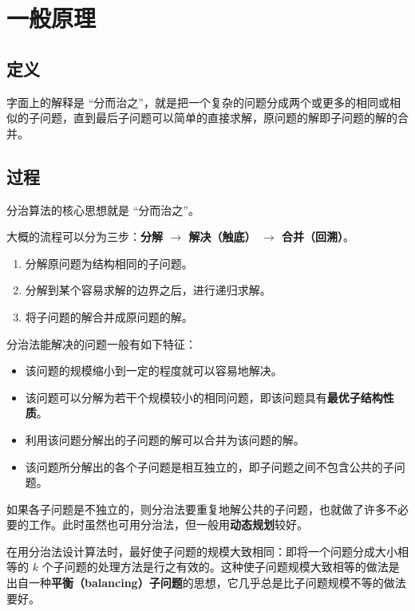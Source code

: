 \section{一般原理}

\subsection{定义}

\begin{definition}
    字面上的解释是 ``分而治之''，就是把一个复杂的问题分成两个或更多的相同或相似的子问题，直到最后子问题可以简单的直接求解，原问题的解即子问题的解的合并。
\end{definition}

\subsection{过程}

分治算法的核心思想就是 ``分而治之''。

大概的流程可以分为三步：\textbf{分解 $\to$ 解决（触底） $\to$ 合并（回溯）}。\begin{enumerate}
    \item 分解原问题为结构相同的子问题。
    \item 分解到某个容易求解的边界之后，进行递归求解。
    \item 将子问题的解合并成原问题的解。
\end{enumerate}
分治法能解决的问题一般有如下特征：\begin{itemize}
    \item 该问题的规模缩小到一定的程度就可以容易地解决。
    \item 该问题可以分解为若干个规模较小的相同问题，即该问题具有\textbf{最优子结构性质}。
    \item 利用该问题分解出的子问题的解可以合并为该问题的解。
    \item 该问题所分解出的各个子问题是相互独立的，即子问题之间不包含公共的子问题。
\end{itemize}

如果各子问题是不独立的，则分治法要重复地解公共的子问题，也就做了许多不必要的工作。此时虽然也可用分治法，但一般用\textbf{动态规划}较好。

在用分治法设计算法时，最好使子问题的规模大致相同：即将一个问题分成大小相等的 $k$ 个子问题的处理方法是行之有效的。这种使子问题规模大致相等的做法是出自一种\textbf{平衡（balancing）子问题}的思想，它几乎总是比子问题规模不等的做法要好。

